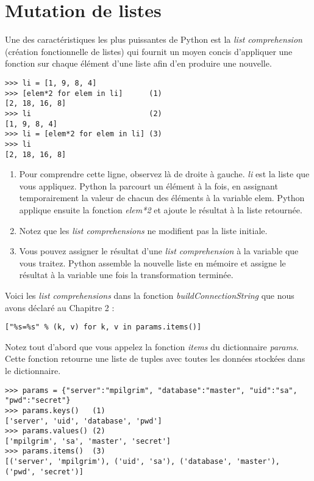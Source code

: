 \section{Mutation de listes}

Une des caractéristiques les plus puissantes de Python est la \emph{list comprehension} (création fonctionnelle de listes) qui fournit un moyen concis d'appliquer une fonction sur chaque élément d'une liste afin d'en produire une nouvelle.

\begin{example}
\begin{lstlisting}
>>> li = [1, 9, 8, 4]
>>> [elem*2 for elem in li]      (1)
[2, 18, 16, 8]
>>> li                           (2)
[1, 9, 8, 4]
>>> li = [elem*2 for elem in li] (3)
>>> li
[2, 18, 16, 8]
\end{lstlisting}
\end{example}

\begin{enumerate}
\item Pour comprendre cette ligne, observez là de droite à gauche. \emph{li} est la
    liste que vous appliquez. Python la parcourt un élément à la fois, en
    assignant temporairement la valeur de chacun des éléments à la variable
    elem. Python applique ensuite la fonction \emph{elem*2} et ajoute le résultat à la
    liste retournée.
\item Notez que les \emph{list comprehensions} ne modifient pas la liste initiale.
\item Vous pouvez assigner le résultat d'une \emph{list comprehension} à la variable que
    vous traitez. Python assemble la nouvelle liste en mémoire et assigne le
    résultat à la variable une fois la transformation terminée.
\end{enumerate}

Voici les \emph{list comprehensions} dans la fonction \emph{buildConnectionString} que nous
avons déclaré au Chapitre 2 :

\begin{lstlisting}
["%s=%s" % (k, v) for k, v in params.items()]
\end{lstlisting}

Notez tout d'abord que vous appelez la fonction \emph{items} du dictionnaire \emph{params}. Cette fonction retourne une liste de tuples avec toutes les données stockées dans le dictionnaire.

\begin{example}
\begin{lstlisting}
>>> params = {"server":"mpilgrim", "database":"master", "uid":"sa", "pwd":"secret"}
>>> params.keys()   (1)
['server', 'uid', 'database', 'pwd']
>>> params.values() (2)
['mpilgrim', 'sa', 'master', 'secret']
>>> params.items()  (3)
[('server', 'mpilgrim'), ('uid', 'sa'), ('database', 'master'), ('pwd', 'secret')]
\end{lstlisting}
\end{example}

